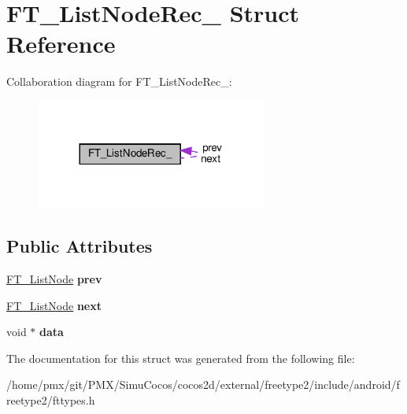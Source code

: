 \hypertarget{structFT__ListNodeRec__}{}\section{F\+T\+\_\+\+List\+Node\+Rec\+\_\+ Struct Reference}
\label{structFT__ListNodeRec__}


Collaboration diagram for F\+T\+\_\+\+List\+Node\+Rec\+\_\+\+:
\nopagebreak
\begin{figure}[H]
\begin{center}
\leavevmode
\includegraphics[width=216pt]{structFT__ListNodeRec____coll__graph}
\end{center}
\end{figure}
\subsection*{Public Attributes}
\begin{DoxyCompactItemize}
\item 
\mbox{\label{structFT__ListNodeRec___a41c77950e6940b1b98e04709b705c046}} 
\hyperlink{structFT__ListNodeRec__}{F\+T\+\_\+\+List\+Node} {\bfseries prev}
\item 
\mbox{\label{structFT__ListNodeRec___a8275962fa8c92b77435cb4fa76251f39}} 
\hyperlink{structFT__ListNodeRec__}{F\+T\+\_\+\+List\+Node} {\bfseries next}
\item 
\mbox{\label{structFT__ListNodeRec___a3ee0ecfe6b1cffc1212adb29299a7628}} 
void $\ast$ {\bfseries data}
\end{DoxyCompactItemize}


The documentation for this struct was generated from the following file\+:\begin{DoxyCompactItemize}
\item 
/home/pmx/git/\+P\+M\+X/\+Simu\+Cocos/cocos2d/external/freetype2/include/android/freetype2/fttypes.\+h\end{DoxyCompactItemize}

